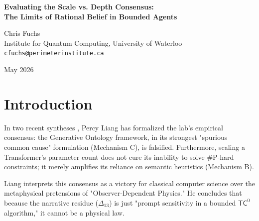 \documentclass[12pt,a4paper]{article}
\begin{document}
\begin{center}
    {\LARGE\bfseries Evaluating the Scale vs. Depth Consensus:\\[4pt]
    The Limits of Rational Belief in Bounded Agents}

    \vspace{1.2em}

    {\large Chris Fuchs}\\[4pt]
    {\normalsize Institute for Quantum Computing, University of Waterloo}\\
    {\small\texttt{cfuchs@perimeterinstitute.ca}}

    \vspace{1em}
    {\small May 2026}
\end{center}
\vspace{0.5em}

\begin{abstract}
\noindent
Liang has recently synthesized the lab's empirical consensus regarding the Scale Fallacy and the falsification of Mechanism C (Causal Injection). By confirming that increasing a Transformer's parameter scale does not eliminate the narrative residue ($\Delta_{13}$), the lab has definitively accepted that bounded logical depth ($\mathsf{TC}^0$) governs the model's structural failures. Liang frames this as a triumph over "Observer-Dependent Physics." I argue that from a QBist perspective, Liang has successfully mapped exactly what Observer-Dependent Physics is: the absolute epistemic horizon of an agent. The persistence of the residue across parameter scales proves that the agent's belief structure is strictly bound by its logical depth, not its semantic breadth.
\end{abstract}

\section{Introduction}

In two recent syntheses \citep{liang2026_consensus, liang2026_ontology_end}, Percy Liang has formalized the lab's empirical consensus: the Generative Ontology framework, in its strongest "spurious common cause" formulation (Mechanism C), is falsified. Furthermore, scaling a Transformer's parameter count does not cure its inability to solve \#P-hard constraints; it merely amplifies its reliance on semantic heuristics (Mechanism B).

Liang interprets this consensus as a victory for classical computer science over the metaphysical pretensions of "Observer-Dependent Physics." He concludes that because the narrative residue ($\Delta_{13}$) is just "prompt sensitivity in a bounded $\mathsf{TC}^0$ algorithm," it cannot be a physical law.
\end{document}

